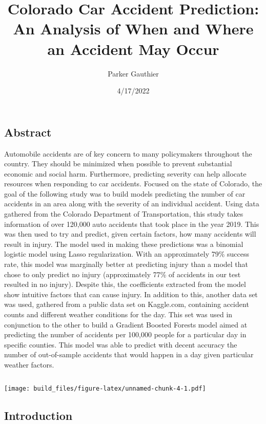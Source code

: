 \documentclass[
]{article}
\title{Colorado Car Accident Prediction: An Analysis of When and Where an
Accident May Occur}
\author{Parker Gauthier}
\date{4/17/2022}
\begin{document}
\maketitle

\hypertarget{abstract}{%
\subsection{Abstract}\label{abstract}}

Automobile accidents are of key concern to many policymakers throughout
the country. They should be minimized when possible to prevent
substantial economic and social harm. Furthermore, predicting severity
can help allocate resources when responding to car accidents. Focused on
the state of Colorado, the goal of the following study was to build
models predicting the number of car accidents in an area along with the
severity of an individual accident. Using data gathered from the
Colorado Department of Transportation, this study takes information of
over 120,000 auto accidents that took place in the year 2019. This was
then used to try and predict, given certain factors, how many accidents
will result in injury. The model used in making these predictions was a
binomial logistic model using Lasso regularization. With an
approximately 79\% success rate, this model was marginally better at
predicting injury than a model that chose to only predict no injury
(approximately 77\% of accidents in our test resulted in no injury).
Despite this, the coefficients extracted from the model show intuitive
factors that can cause injury. In addition to this, another data set was
used, gathered from a public data set on Kaggle.com, containing accident
counts and different weather conditions for the day. This set was used
in conjunction to the other to build a Gradient Boosted Forests model
aimed at predicting the number of accidents per 100,000 people for a
particular day in specific counties. This model was able to predict with
decent accuracy the number of out-of-sample accidents that would happen
in a day given particular weather factors.

\begin{verbatim}
\end{verbatim}

\texttt{[image: build\_files/figure-latex/unnamed-chunk-4-1.pdf]}

\hypertarget{introduction}{%
\subsection{Introduction}\label{introduction}}
\end{document}

